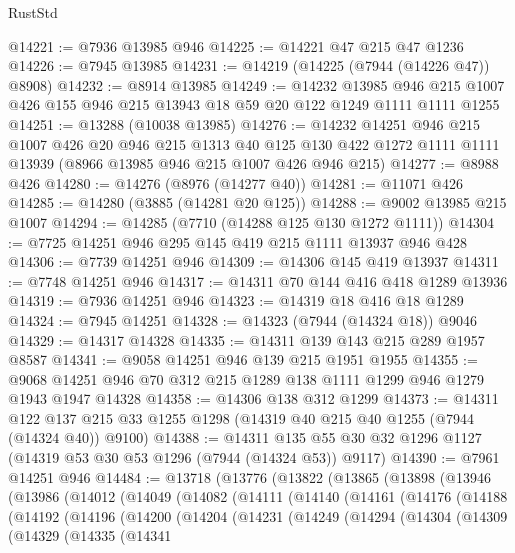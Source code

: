 \begin{lexlean}{RustStd}
\begin{coremodule}
@14221 := @7936 @13985 @946
@14225 := @14221 @47 @215 @47 @1236
@14226 := @7945 @13985
@14231 := @14219 (@14225 (@7944 (@14226 @47)) @8908)
@14232 := @8914 @13985
@14249 := @14232
    @13985
    @946
    @215
    @1007
    @426
    @155
    @946
    @215
    @13943
    @18
    @59
    @20
    @122
    @1249
    @1111
    @1111
    @1255
@14251 := @13288 (@10038 @13985)
@14276 := @14232
    @14251
    @946
    @215
    @1007
    @426
    @20
    @946
    @215
    @1313
    @40
    @125
    @130
    @422
    @1272
    @1111
    @1111
    @13939
    (@8966 @13985 @946 @215 @1007 @426 @946 @215)
@14277 := @8988 @426
@14280 := @14276 (@8976 (@14277 @40))
@14281 := @11071 @426
@14285 := @14280 (@3885 (@14281 @20 @125))
@14288 := @9002 @13985 @215 @1007
@14294 := @14285 (@7710 (@14288 @125 @130 @1272 @1111))
@14304 := @7725 @14251 @946 @295 @145 @419 @215 @1111 @13937 @946 @428
@14306 := @7739 @14251 @946
@14309 := @14306 @145 @419 @13937
@14311 := @7748 @14251 @946
@14317 := @14311 @70 @144 @416 @418 @1289 @13936
@14319 := @7936 @14251 @946
@14323 := @14319 @18 @416 @18 @1289
@14324 := @7945 @14251
@14328 := @14323 (@7944 (@14324 @18)) @9046
@14329 := @14317 @14328
@14335 := @14311 @139 @143 @215 @289 @1957 @8587
@14341 := @9058 @14251 @946 @139 @215 @1951 @1955
@14355 := @9068 @14251 @946 @70 @312 @215 @1289 @138 @1111 @1299 @946 @1279 @1943 @1947 @14328
@14358 := @14306 @138 @312 @1299
@14373 := @14311
    @122
    @137
    @215
    @33
    @1255
    @1298
    (@14319 @40 @215 @40 @1255 (@7944 (@14324 @40)) @9100)
@14388 := @14311 @135 @55 @30 @32 @1296 @1127 (@14319 @53 @30 @53 @1296 (@7944 (@14324 @53)) @9117)
@14390 := @7961 @14251 @946
@14484 := @13718
    (@13776
      (@13822
        (@13865
          (@13898
            (@13946
              (@13986
                (@14012
                  (@14049
                    (@14082
                      (@14111
                        (@14140
                          (@14161
                            (@14176
                              (@14188
                                (@14192
                                  (@14196
                                    (@14200
                                      (@14204
                                        (@14231
                                          (@14249
                                            (@14294
                                              (@14304
                                                (@14309
                                                  (@14329
                                                    (@14335
                                                      (@14341

\end{coremodule}
\end{lexlean}
